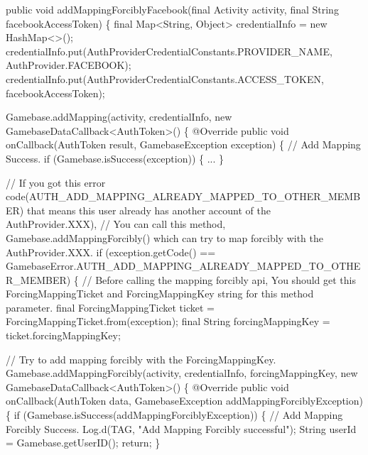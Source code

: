 \begin{DoxyCode}
 \textcolor{keyword}{public} \textcolor{keywordtype}{void} addMappingForciblyFacebook(\textcolor{keyword}{final} Activity activity, \textcolor{keyword}{final} String facebookAccessToken) \{
    \textcolor{keyword}{final} Map<String, Object> credentialInfo = \textcolor{keyword}{new} HashMap<>();
    credentialInfo.put(AuthProviderCredentialConstants.PROVIDER\_NAME, AuthProvider.FACEBOOK);
    credentialInfo.put(AuthProviderCredentialConstants.ACCESS\_TOKEN, facebookAccessToken);

    Gamebase.addMapping(activity, credentialInfo, \textcolor{keyword}{new} GamebaseDataCallback<AuthToken>() \{
        @Override
        \textcolor{keyword}{public} \textcolor{keywordtype}{void} onCallback(AuthToken result, GamebaseException exception) \{
            \textcolor{comment}{// Add Mapping Success.}
            \textcolor{keywordflow}{if} (Gamebase.isSuccess(exception)) \{
                ...
            \}

            \textcolor{comment}{// If you got this error code(AUTH\_ADD\_MAPPING\_ALREADY\_MAPPED\_TO\_OTHER\_MEMBER) that means this
       user already has another account of the AuthProvider.XXX),}
            \textcolor{comment}{// You can call this method, Gamebase.addMappingForcibly() which can try to map forcibly with
       the AuthProvider.XXX.}
            \textcolor{keywordflow}{if} (exception.getCode() == GamebaseError.AUTH\_ADD\_MAPPING\_ALREADY\_MAPPED\_TO\_OTHER\_MEMBER) \{
                \textcolor{comment}{// Before calling the mapping forcibly api, You should get this ForcingMappingTicket and
       ForcingMappingKey string for this method parameter.}
                \textcolor{keyword}{final} ForcingMappingTicket ticket = ForcingMappingTicket.from(exception);
                \textcolor{keyword}{final} String forcingMappingKey = ticket.forcingMappingKey;

                \textcolor{comment}{// Try to add mapping forcibly with the ForcingMappingKey.}
                Gamebase.addMappingForcibly(activity, credentialInfo, forcingMappingKey, \textcolor{keyword}{new} 
      GamebaseDataCallback<AuthToken>() \{
                    @Override
                    \textcolor{keyword}{public} \textcolor{keywordtype}{void} onCallback(AuthToken data, GamebaseException addMappingForciblyException) \{
                        \textcolor{keywordflow}{if} (Gamebase.isSuccess(addMappingForciblyException)) \{
                            \textcolor{comment}{// Add Mapping Forcibly Success.}
                            Log.d(TAG, \textcolor{stringliteral}{"Add Mapping Forcibly successful"});
                            String userId = Gamebase.getUserID();
                            \textcolor{keywordflow}{return};
                        \}


\end{DoxyCode}
